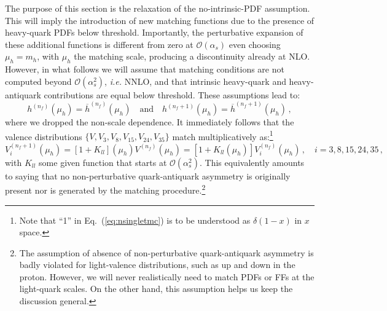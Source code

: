 \documentclass[10pt,a4paper]{article}
\begin{document}
The purpose of this section is the relaxation of the no-intrinsic-PDF
assumption. This will imply the introduction of new matching functions
due to the presence of heavy-quark PDFs below threshold. Importantly,
the perturbative expansion of these additional functions is different
from zero at $\mathcal{O}(\alpha_s)$ even choosing $\mu_h=m_h$, with
$\mu_h$ the matching scale, producing a discontinuity already at NLO.
However, in what follows we will assume that matching conditions are
not computed beyond $\mathcal{O}(\alpha_s^2)$, \textit{i.e.}  NNLO,
and that intrinsic heavy-quark and heavy-antiquark contributions are
equal below threshold. These assumptions lead to:
\begin{equation}
h^{(n_f)}(\mu_h) = \overline{h}^{(n_f)}(\mu_h)\quad\mbox{and}\quad h^{(n_f+1)}(\mu_h) = \overline{h}^{(n_f+1)}(\mu_h)\,,
\end{equation}
where we dropped the non-scale dependence. It immediately follows that
the valence distributions $\{V,V_3,V_8,V_{15},V_{24},V_{35}\}$ match
multiplicatively as:\footnote{Note that ``1'' in
  Eq.~(\ref{eq:nsingletmc}) is to be understood as $\delta(1-x)$ in
  $x$ space.}
\begin{equation}
V_i^{(n_f+1)}(\mu_h) = [1+K_{ll}](\mu_h) V^{(n_f)}(\mu_h) =
[1+K_{ll}(\mu_h)] V_i^{(n_f)}(\mu_h)\,,\quad i = 3,8,15,24,35\,,
\label{eq:nsingletmc}
\end{equation}
with $K_{ll}$ some given function that starts at
$\mathcal{O}(\alpha_s^2)$. This equivalently amounts to saying that no
non-perturbative quark-antiquark asymmetry is originally present nor
is generated by the matching procedure.\footnote{The assumption of
  absence of non-perturbative quark-antiquark asymmetry is badly
  violated for light-valence distributions, such as up and down in the
  proton. However, we will never realistically need to match PDFs or
  FFs at the light-quark scales. On the other hand, this assumption
  helps us keep the discussion general.}
\end{document}
